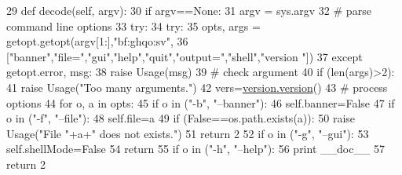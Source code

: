 \begin{DoxyCode}
29     \textcolor{keyword}{def }decode(self, argv):
30         \textcolor{keywordflow}{if} argv==\textcolor{keywordtype}{None}:
31                 argv = sys.argv
32         \textcolor{comment}{# parse command line options}
33         \textcolor{keywordflow}{try}:
34             \textcolor{keywordflow}{try}:
35                 opts, args = getopt.getopt(argv[1:],\textcolor{stringliteral}{"bf:ghqo:sv"},
36                                            [\textcolor{stringliteral}{"banner"},\textcolor{stringliteral}{"file="},\textcolor{stringliteral}{"gui"},\textcolor{stringliteral}{"help"},\textcolor{stringliteral}{"quit"},\textcolor{stringliteral}{"output="},\textcolor{stringliteral}{"shell"},\textcolor{stringliteral}{"version
      "}])
37             \textcolor{keywordflow}{except} getopt.error, msg:
38                 \textcolor{keywordflow}{raise} Usage(msg)
39             \textcolor{comment}{# check argument}
40             \textcolor{keywordflow}{if} (len(args)>2):
41                 \textcolor{keywordflow}{raise} Usage(\textcolor{stringliteral}{"Too many arguments."})
42             vers=\hyperlink{classversion_1_1version}{version.version}()
43             \textcolor{comment}{# process options}
44             \textcolor{keywordflow}{for} o, a \textcolor{keywordflow}{in} opts:
45                 \textcolor{keywordflow}{if} o \textcolor{keywordflow}{in} (\textcolor{stringliteral}{"-b"}, \textcolor{stringliteral}{"--banner"}):
46                     self.banner=\textcolor{keyword}{False}
47                 \textcolor{keywordflow}{if} o \textcolor{keywordflow}{in} (\textcolor{stringliteral}{"-f"}, \textcolor{stringliteral}{"--file"}):
48                     self.file=a
49                     \textcolor{keywordflow}{if} (\textcolor{keyword}{False}==os.path.exists(a)):
50                         \textcolor{keywordflow}{raise} Usage(\textcolor{stringliteral}{"File "}+a+\textcolor{stringliteral}{" does not exists."})
51                         \textcolor{keywordflow}{return} 2
52                 \textcolor{keywordflow}{if} o \textcolor{keywordflow}{in} (\textcolor{stringliteral}{"-g"}, \textcolor{stringliteral}{"--gui"}):
53                     self.shellMode=\textcolor{keyword}{False}
54                     \textcolor{keywordflow}{return}
55                 \textcolor{keywordflow}{if} o \textcolor{keywordflow}{in} (\textcolor{stringliteral}{"-h"}, \textcolor{stringliteral}{"--help"}):
56                     \textcolor{keywordflow}{print} \_\_doc\_\_
57                     \textcolor{keywordflow}{return} 2

\end{DoxyCode}
